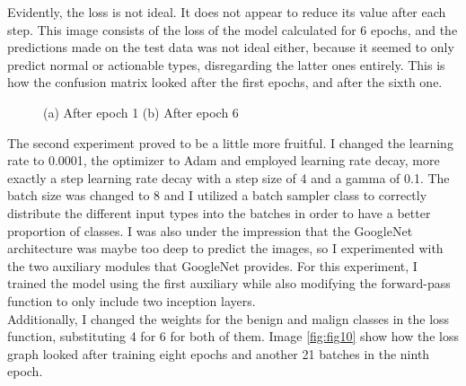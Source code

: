 Evidently, the loss is not ideal. It does not appear to reduce its value after each step. This image consists of the loss of the model calculated for 6 epochs, and the predictions made on the test data was not ideal either, because it seemed to only predict normal or actionable types, disregarding the latter ones entirely. This is how the confusion matrix looked after the first epochs, and after the sixth one.\\
\begin{figure}[ht!]
    \caption{(a) After epoch 1 (b) After epoch 6}
    \label{fig:fig9}
\end{figure}
The second experiment proved to be a little more fruitful. I changed the learning rate to 0.0001, the optimizer to Adam and employed learning rate decay, more exactly a step learning rate decay with a step size of 4 and a gamma of 0.1. The batch size was changed to 8 and I utilized a batch sampler class to correctly distribute the different input types into the batches in order to have a better proportion of classes. I was also under the impression that the GoogleNet architecture was maybe too deep to predict the images, so I experimented with the two auxiliary modules that GoogleNet provides. For this experiment, I trained the model using the first auxiliary while also modifying the forward-pass function to only include two inception layers.\\
Additionally, I changed the weights for the benign and malign classes in the loss function, substituting 4 for 6 for both of them. Image \ref{fig:fig10} show how the loss graph looked after training eight epochs and another 21 batches in the ninth epoch.\\
